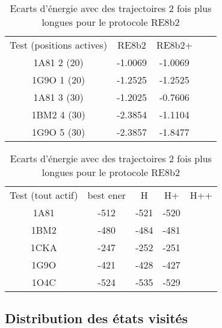     \begin{table}[h]
      \centering

      \begin{tabular}{ccccc}

        \toprule
        Test (positions actives)& RE8b2 & RE8b2+ \\
        \cmidrule{1-3}
        1A81 2 (20) & -1.0069 & -1.0069  \\
        1G9O 1 (20) & -1.2525 & -1.2525 \\
        1A81 3 (30) & -1.2025 & -0.7606 \\
        1BM2 4 (30) & -2.3854 & -1.1104 \\
        1G9O 5 (30) & -2.3857 & -1.8477 \\
        \toprule


 \end{tabular}      
 \caption{Ecarts d'énergie avec des trajectoires 2 fois plus longues pour le protocole RE8b2}
\label{tab:RE8b2+_RE8b2++}       
\end{table}


    \begin{table}[h]
      \centering

      \begin{tabular}{ccccc}

        \toprule
        Test (tout actif) & best ener & H & H+ & H++ \\
        \cmidrule{1-5}
        1A81 & -512 & -521 & -520 &  \\
        1BM2 & -480 & -484 & -481 &  \\
        1CKA & -247 & -252 & -251 &  \\
        1G9O & -421 & -428 & -427 &  \\
        1O4C & -524 & -535 & -529 &  \\
        \toprule


 \end{tabular}      
 \caption{Ecarts d'énergie avec des trajectoires 2 fois plus longues pour le protocole RE8b2}
\label{tab:RE8b2+_RE8b2++}       
\end{table}






    \clearpage
   \subsection{Distribution des états visités }
